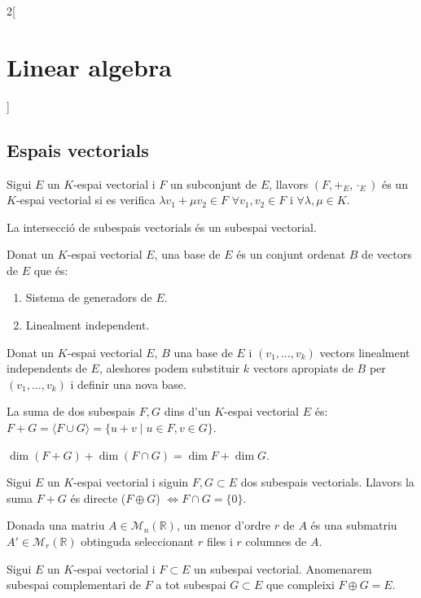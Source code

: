 \documentclass[class=article,10pt,crop=false]{standalone}
\begin{document}
\begin{multicols}{2}[\section{Linear algebra}]
\subsection{Espais vectorials}
\begin{definition}
Sigui $E$ un $K$-espai vectorial i $F$ un subconjunt de $E$, llavors $(F,+_E,\cdot_E)$ és un $K$-espai vectorial si es verifica $\lambda v_1+\mu v_2\in F$ $\forall v_1,v_2\in F$ i $\forall\lambda,\mu\in K$.
\end{definition}
\begin{lemma}
La intersecció de subespais vectorials és un subespai vectorial.
\end{lemma}
\begin{definition}
Donat un $K$-espai vectorial $E$, una base de $E$ és un conjunt ordenat $B$ de vectors de $E$ que és: 
\begin{enumerate}
    \item Sistema de generadors de $E$.
    \item Linealment independent.
\end{enumerate}
\end{definition}
\begin{theorem}
Donat un $K$-espai vectorial $E$, $B$ una base de $E$ i $(v_1,\ldots,v_k)$ vectors linealment independents de $E$, aleshores podem substituir $k$ vectors apropiats de $B$ per $(v_1,\ldots,v_k)$ i definir una nova base.
\end{theorem}
\begin{definition}
La suma de dos subespais $F,G$ dins d'un $K$-espai vectorial $E$ és: $F+G=\langle F\cup G\rangle=\{u+v\mid u\in F,v\in G\}$.
\end{definition}
\begin{prop}
$\dim (F+G)+\dim(F\cap G)=\dim F+\dim G$.
\end{prop}
\begin{definition}
Sigui $E$ un $K$-espai vectorial i siguin $F,G\subset E$ dos subespais vectorials. Llavors la suma $F+G$ és directe ($F\oplus G$) $\iff F\cap G=\{0\}$.
\end{definition}
\begin{definition}
Donada una matriu $A\in\mathcal{M}_n(\mathbb{R})$, un menor d'ordre $r$ de $A$ és una submatriu $A'\in\mathcal{M}_r(\mathbb{R})$ obtinguda seleccionant $r$ files i $r$ columnes de $A$.
\end{definition}
\begin{definition}
Sigui $E$ un $K$-espai vectorial i $F\subset E$ un subespai vectorial. Anomenarem subespai complementari de $F$ a tot subespai $G\subset E$ que compleixi $F\oplus G=E$.

\end{definition}
\end{multicols}
\end{document}
